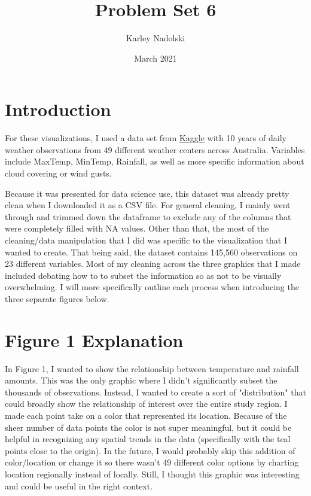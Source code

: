\documentclass{article}
\title{Problem Set 6}
\author{Karley Nadolski}
\date{March 2021}
\begin{document}
\maketitle

\section{Introduction}
For these visualizations, I used a data set from \href{https://www.kaggle.com/jsphyg/weather-dataset-rattle-package}{Kaggle} with 10 years of daily weather observations from 49 different weather centers across Australia. Variables include MaxTemp, MinTemp, Rainfall, as well as more specific information about cloud covering or wind gusts. 

Because it was presented for data science use, this dataset was already pretty clean when I downloaded it as a CSV file. For general cleaning, I mainly went through and trimmed down the dataframe to exclude any of the columns that were completely filled with NA values. Other than that, the most of the cleaning/data manipulation that I did was specific to the visualization that I wanted to create. That being said, the dataset contains 145,560 observations on 23 different variables. Most of my cleaning across the three graphics that I made included debating how to to subset the information so as not to be visually overwhelming. I will more specifically outline each process when introducing the three separate figures below. 

\section{Figure 1 Explanation} 
In Figure 1, I wanted to show the relationship between temperature and rainfall amounts. This was the only graphic where I didn't significantly subset the thousands of observations. Instead, I wanted to create a sort of "distribution" that could broadly show the relationship of interest over the entire study region. I made each point take on a color that represented its location. Because of the sheer number of data points the color is not super meaningful, but it could be helpful in recognizing any spatial trends in the data (specifically with the teal points close to the origin). In the future, I would probably skip this addition of color/location or change it so there wasn't 49 different color options by charting location regionally instead of locally. Still, I thought this graphic was interesting and could be useful in the right context. 
\end{document}
